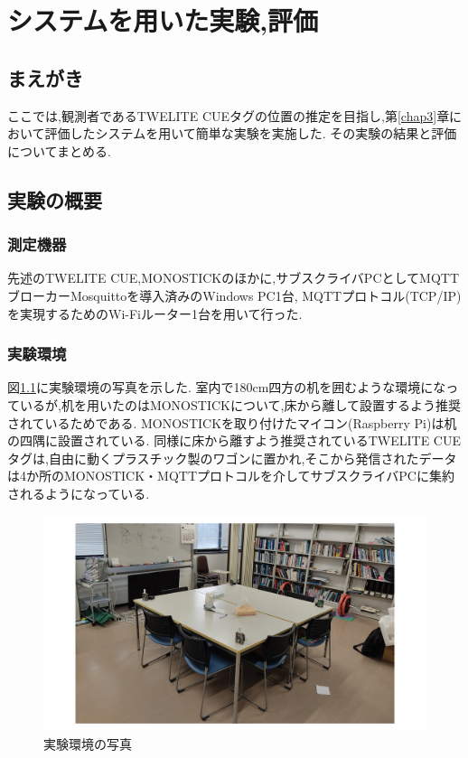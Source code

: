 \chapter{システムを用いた実験,評価}

\section{まえがき}
ここでは,観測者であるTWELITE CUEタグの位置の推定を目指し,第\ref{chap3}章において評価したシステムを用いて簡単な実験を実施した.
その実験の結果と評価についてまとめる.

\section{実験の概要}

\subsection{測定機器}
先述のTWELITE CUE,MONOSTICKのほかに,サブスクライバPCとしてMQTTブローカーMosquittoを導入済みのWindows PC1台,
MQTTプロトコル(TCP/IP)を実現するためのWi-Fiルーター1台を用いて行った.


\subsection{実験環境}
図\ref{TWjikken}に実験環境の写真を示した.
室内で180cm四方の机を囲むような環境になっているが,机を用いたのはMONOSTICKについて,床から離して設置するよう推奨されているためである.
MONOSTICKを取り付けたマイコン(Raspberry Pi)は机の四隅に設置されている.
同様に床から離すよう推奨されているTWELITE CUEタグは,自由に動くプラスチック製のワゴンに置かれ,そこから発信されたデータは4か所のMONOSTICK・MQTTプロトコルを介してサブスクライバPCに集約されるようになっている.


\begin{figure}[htb]
  \centering
   \includegraphics[width = 15cm, bb= 0 0 1000 600]{chapter4/TWjikken.png}
   \caption{実験環境の写真}
   \label{TWjikken}
\end{figure}


